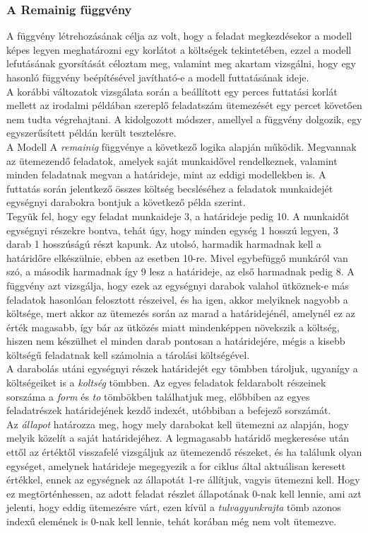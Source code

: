 \documentclass [12pt]{report}
\begin{document}
\subsubsection{A Remainig függvény}
A függvény létrehozásának célja az volt, hogy a feladat megkezdésekor a modell képes legyen meghatározni egy korlátot a költségek tekintetében, ezzel a modell lefutásának gyorsítását céloztam meg, valamint meg akartam vizsgálni, hogy egy hasonló függvény beépítésével javítható-e a modell futtatásának ideje.\\
A korábbi változatok vizsgálata során a beállított egy perces futtatási korlát mellett az irodalmi példában szereplő feladatszám ütemezését egy percet követően nem tudta végrehajtani. A kidolgozott módszer, amellyel a függvény dolgozik, egy egyszerűsített példán került tesztelésre.\\
A Modell A \emph{remainig} függvénye a következő logika alapján működik. Megvannak az ütemezendő feladatok, amelyek saját munkaidővel rendelkeznek, valamint minden feladatnak megvan a határideje, mint az eddigi modellekben is. A futtatás során jelentkező összes költség becsléséhez a feladatok munkaidejét egységnyi darabokra bontjuk a következő példa szerint.\\
Tegyük fel, hogy egy feladat munkaideje 3, a határideje pedig 10. A munkaidőt egységnyi részekre bontva, tehát úgy, hogy minden egység 1 hosszú legyen, 3 darab 1 hosszúságú részt kapunk. Az utolsó, harmadik harmadnak kell a határidőre elkészülnie, ebben az esetben 10-re. Mivel egybefüggő munkáról van szó, a második harmadnak így 9 lesz a határideje, az első harmadnak pedig 8. A függvény azt vizsgálja, hogy ezek az egységnyi darabok valahol ütköznek-e más feladatok hasonlóan felosztott részeivel, és ha igen, akkor melyiknek nagyobb a költsége, mert akkor az ütemezés során az marad a határidejénél, amelynél ez az érték magasabb, így bár az ütközés miatt mindenképpen növekszik a költség, hiszen nem készülhet el minden darab pontosan a határidejére, mégis a kisebb költségű feladatnak kell számolnia a tárolási költségével. \\
A darabolás utáni egységnyi részek határidejét egy tömbben tároljuk, ugyanígy a költségeiket is a \emph{koltség} tömbben. Az egyes feladatok feldarabolt részeinek sorszáma a \emph{form} és \emph{to} tömbökben találhatjuk meg, előbbiben az egyes feladatrészek határidejének kezdő indexét, utóbbiban a befejező sorszámát. \\
Az \emph{állapot} határozza meg, hogy mely darabokat kell ütemezni az alapján, hogy melyik közelít a saját határidejéhez. A legmagasabb határidő megkeresése után ettől az értéktől visszafelé vizsgáljuk az ütemezendő részeket, és ha találunk olyan egységet, amelynek határideje megegyezik a for ciklus által aktuálisan keresett értékkel, ennek az egységnek az állapotát 1-re állítjuk, vagyis ütemezni kell. Hogy ez megtörténhessen, az adott feladat részlet állapotának 0-nak kell lennie, ami azt jelenti, hogy eddig ütemezésre várt, ezen kívül a \emph{tulvagyunkrajta} tömb azonos indexű elemének is 0-nak kell lennie, tehát korában még nem volt ütemezve. \\
\end{document}
